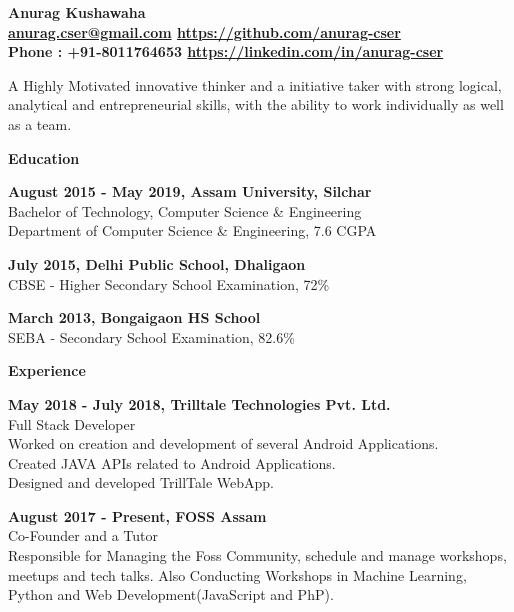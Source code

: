 \documentclass[a4paper,11pt,final]{memoir}
\newcommand{\Sep}{\vspace{1.5em}}
\newcommand{\SmallSep}{\vspace{0.5em}}
\newcommand{\CVSection}[1]
	{\Large\textbf{#1}\par
	\SmallSep\normalsize\normalfont}
\newcommand{\CVItem}[1]
	{\textbf{\color{RoyalBlue} #1}}
\begin{document}
\begin{figure}

\end{figure}

\begin{flushright}\small

\end{flushright}\normalsize
\framebreak


\Huge\bfseries {\color{RoyalBlue} Anurag Kushawaha } \\
\small \href{mailto:anurag.cser@gmail.com}{anurag.cser@gmail.com} \hspace{5mm} \href{https://github.com/anurag-cser}{https://github.com/anurag-cser}  \\
Phone : +91-8011764653 \hspace{3mm} \href{https://linkedin.com/in/anurag-cser}{https://linkedin.com/in/anurag-cser}\\
\normalsize\normalfont

A Highly Motivated innovative thinker and a initiative taker with strong logical, analytical and entrepreneurial skills, with the ability to work individually as well as a team.

\Sep

\CVSection{Education}
\CVItem{August 2015 - May 2019, Assam University, Silchar}\\
Bachelor of Technology, Computer Science \& Engineering\\
Department of Computer Science \& Engineering, 7.6 CGPA
\SmallSep

\CVItem{July 2015, Delhi Public School, Dhaligaon}\\
CBSE - Higher Secondary School Examination, 72\%
\SmallSep

\CVItem{March 2013, Bongaigaon HS School}\\
SEBA - Secondary School Examination, 82.6\%
\SmallSep

\CVSection{Experience}
\CVItem{May 2018 - July 2018, Trilltale Technologies Pvt. Ltd.}\\
Full Stack Developer\\
Worked on creation and development of several Android Applications. \\
Created JAVA APIs related to Android Applications. \\
Designed and developed TrillTale WebApp.
\SmallSep

\CVItem{August 2017 - Present, FOSS Assam}\\
Co-Founder and a Tutor\\
Responsible for Managing the Foss Community, schedule and manage workshops, meetups and tech talks.
Also Conducting Workshops in Machine Learning, Python and Web Development(JavaScript and PhP).
\SmallSep
\end{document}
